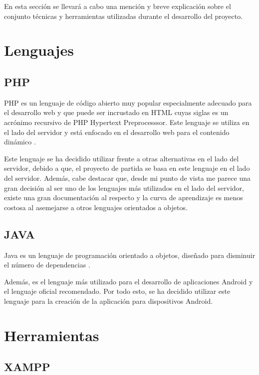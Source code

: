 
En esta sección se llevará a cabo una mención y breve explicación sobre el conjunto técnicas y herramientas utilizadas durante el desarrollo del proyecto.

\section{Lenguajes}

\subsection{PHP}

PHP es un lenguaje de código abierto muy popular especialmente adecuado para el desarrollo web y que puede ser incrustado en HTML \cite{wiki:php} cuyas siglas es un acrónimo recursivo de PHP Hypertext Preprocesssor. Este lenguaje se utiliza en el lado del servidor y está enfocado en el desarrollo web para el contenido dinámico \cite{wiki:php2}.

Este lenguaje se ha decidido utilizar frente a otras alternativas en el lado del servidor, debido a que, el proyecto de partida se basa en este lenguaje en el lado del servidor. Además, cabe destacar que, desde mi punto de vista me parece una gran decisión al ser uno de los lenguajes más utilizados en el lado del servidor, existe una gran documentación al respecto y la curva de aprendizaje es menos costosa al asemejarse a otros lenguajes orientados a objetos.

\subsection{JAVA}

Java es un lenguaje de programación orientado a objetos, diseñado para disminuir el número de dependencias \cite{wiki:java}.

Además, es el lenguaje más utilizado para el desarrollo de aplicaciones Android y el lenguaje oficial recomendado. Por todo esto, se ha decidido utilizar este lenguaje para la creación de la aplicación para dispositivos Android.


\section{Herramientas}

\subsection{XAMPP}

